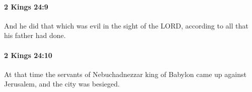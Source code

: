 		\paragraph{2 Kings 24:9} %
			\label{2KINGS-24-9}

			And he did that which was evil in the sight of the LORD, according to all that his father had done.


		\paragraph{2 Kings 24:10} %
			\label{2KINGS-24-10}

			At that time the servants of Nebuchadnezzar king of Babylon came up against Jerusalem, and the city was besieged.


